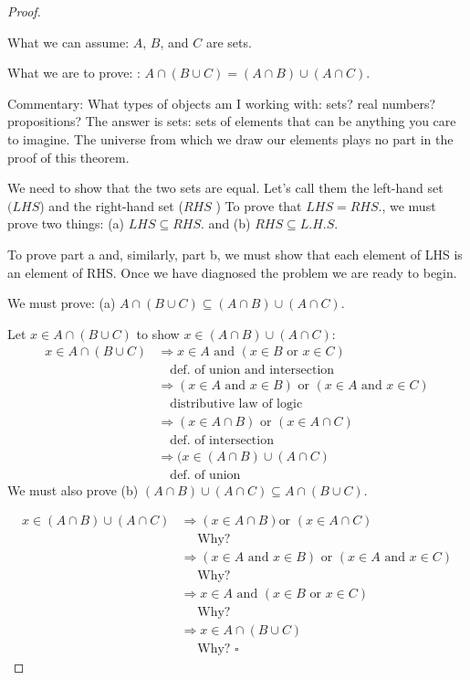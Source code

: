 \documentclass[10pt,]{book}
\theoremstyle{plain}
\theoremstyle{definition}
\theoremstyle{definition}
\theoremstyle{definition}
\begin{document}
\begin{proof}\hypertarget{proof-1}{}
What we can assume: \(A\), \(B\), and \(C\) are sets.%
\par
What we are to prove: : \(A\cap  (B \cup  C) = (A\cap B) \cup  (A \cap  C)\).%
\par
Commentary: What types of objects am I working with: sets? real numbers? propositions? The answer is sets: sets of elements
that can be anything you care to imagine. The universe from which we draw our elements plays no part in the proof of this theorem.%
\par
We need to show that the two sets are equal. Let's call them the left-hand set \((LHS\)) and the right-hand set (\(RHS\) ) To prove that \(LHS = RHS\)., we must prove two things: (a) \(LHS\subseteq RHS\). and (b) \(RHS\subseteq L.H.S\).%
\par
To prove part a and, similarly, part b, we must show that each element of LHS is an element of RHS.  Once we have diagnosed the problem we are ready to begin.%
\par
We must prove:
(a) \(A \cap  (B \cup  C)\subseteq (A\cap B) \cup  (A\cap C)\).%
\par

Let \(x \in  A\cap (B \cup  C)\) to show \(x\in (A\cap B) \cup  (A \cap C)\):
\begin{equation*}
\begin{split}
x \in A \cap (B \cup C) & \Rightarrow x\in A \textrm{ and } (x\in B\textrm{ or } x\in C)\\
	& \quad \textrm{def. of union and intersection}\\
	& \Rightarrow  (x \in A\textrm{ and }x\in B)\textrm{ or } (x\in A\textrm{ and }x\in C)\\
	&\quad \textrm{distributive law of logic}\\
	& \Rightarrow  (x \in A \cap B) \textrm{ or } (x \in A \cap C)\\
	&\quad \textrm{def. of intersection}\\
	& \Rightarrow  (x \in (A \cap B) \cup (A \cap C)\\
	&\quad \textrm{def. of union}
 \end{split}
\end{equation*}
We must also prove (b) \((A\cap B) \cup  (A\cap C)\subseteq A \cap  (B \cup  C)\).%
\par
\begin{equation*}
\begin{split}
x\in (A\cap B) \cup  (A \cap C)& \Rightarrow  (x\in A\cap B)\text{or } (x\in A\cap C)\\
			&\quad \textrm{ Why? } \\
			& \Rightarrow (x\in A\textrm{ and }x\in B)\textrm{ or } (x\in A\textrm{ and }x\in C)\\
			&\quad\textrm{ Why? }\\
			&\Rightarrow  x\in A \textrm{ and } (x\in B\textrm{ or }x\in C)\\
			&\quad\textrm{ Why? }\\
			&\Rightarrow x\in A\cap (B\cup C)\\
			&\quad\textrm{ Why? } \square
\end{split}
 \end{equation*}%
\end{proof}
\end{document}
